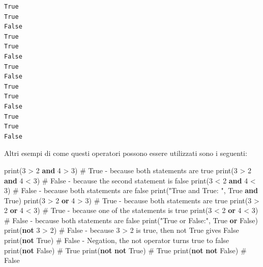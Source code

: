 \documentclass[
  letterpaper,
  krantz2]{{[}./krantz{]}}
\newenvironment{Shaded}{\begin{snugshade}}{\end{snugshade}}
\newcommand{\BuiltInTok}[1]{\textcolor[rgb]{0.00,0.23,0.31}{#1}}
\newcommand{\CommentTok}[1]{\textcolor[rgb]{0.37,0.37,0.37}{#1}}
\newcommand{\DecValTok}[1]{\textcolor[rgb]{0.68,0.00,0.00}{#1}}
\newcommand{\KeywordTok}[1]{\textcolor[rgb]{0.00,0.23,0.31}{\textbf{#1}}}
\newcommand{\NormalTok}[1]{\textcolor[rgb]{0.00,0.23,0.31}{#1}}
\newcommand{\OperatorTok}[1]{\textcolor[rgb]{0.37,0.37,0.37}{#1}}
\newcommand{\StringTok}[1]{\textcolor[rgb]{0.13,0.47,0.30}{#1}}
\newcommand{\VariableTok}[1]{\textcolor[rgb]{0.07,0.07,0.07}{#1}}
\begin{document}
\begin{verbatim}
True
True
False
True
True
False
True
False
True
True
False
True
True
False
\end{verbatim}

Altri esempi di come questi operatori possono essere utilizzati sono i
seguenti:

\begin{Shaded}
\begin{Highlighting}[]
\BuiltInTok{print}\NormalTok{(}\DecValTok{3} \OperatorTok{\textgreater{}} \DecValTok{2} \KeywordTok{and} \DecValTok{4} \OperatorTok{\textgreater{}} \DecValTok{3}\NormalTok{)  }\CommentTok{\# True {-} because both statements are true}
\BuiltInTok{print}\NormalTok{(}\DecValTok{3} \OperatorTok{\textgreater{}} \DecValTok{2} \KeywordTok{and} \DecValTok{4} \OperatorTok{\textless{}} \DecValTok{3}\NormalTok{)  }\CommentTok{\# False {-} because the second statement is false}
\BuiltInTok{print}\NormalTok{(}\DecValTok{3} \OperatorTok{\textless{}} \DecValTok{2} \KeywordTok{and} \DecValTok{4} \OperatorTok{\textless{}} \DecValTok{3}\NormalTok{)  }\CommentTok{\# False {-} because both statements are false}
\BuiltInTok{print}\NormalTok{(}\StringTok{"True and True: "}\NormalTok{, }\VariableTok{True} \KeywordTok{and} \VariableTok{True}\NormalTok{)}
\BuiltInTok{print}\NormalTok{(}\DecValTok{3} \OperatorTok{\textgreater{}} \DecValTok{2} \KeywordTok{or} \DecValTok{4} \OperatorTok{\textgreater{}} \DecValTok{3}\NormalTok{)  }\CommentTok{\# True {-} because both statements are true}
\BuiltInTok{print}\NormalTok{(}\DecValTok{3} \OperatorTok{\textgreater{}} \DecValTok{2} \KeywordTok{or} \DecValTok{4} \OperatorTok{\textless{}} \DecValTok{3}\NormalTok{)  }\CommentTok{\# True {-} because one of the statements is true}
\BuiltInTok{print}\NormalTok{(}\DecValTok{3} \OperatorTok{\textless{}} \DecValTok{2} \KeywordTok{or} \DecValTok{4} \OperatorTok{\textless{}} \DecValTok{3}\NormalTok{)  }\CommentTok{\# False {-} because both statements are false}
\BuiltInTok{print}\NormalTok{(}\StringTok{"True or False:"}\NormalTok{, }\VariableTok{True} \KeywordTok{or} \VariableTok{False}\NormalTok{)}
\BuiltInTok{print}\NormalTok{(}\KeywordTok{not} \DecValTok{3} \OperatorTok{\textgreater{}} \DecValTok{2}\NormalTok{)  }\CommentTok{\# False {-} because 3 \textgreater{} 2 is true, then not True gives False}
\BuiltInTok{print}\NormalTok{(}\KeywordTok{not} \VariableTok{True}\NormalTok{)  }\CommentTok{\# False {-} Negation, the not operator turns true to false}
\BuiltInTok{print}\NormalTok{(}\KeywordTok{not} \VariableTok{False}\NormalTok{)  }\CommentTok{\# True}
\BuiltInTok{print}\NormalTok{(}\KeywordTok{not} \KeywordTok{not} \VariableTok{True}\NormalTok{)  }\CommentTok{\# True}
\BuiltInTok{print}\NormalTok{(}\KeywordTok{not} \KeywordTok{not} \VariableTok{False}\NormalTok{)  }\CommentTok{\# False}
\end{Highlighting}
\end{Shaded}
\end{document}
